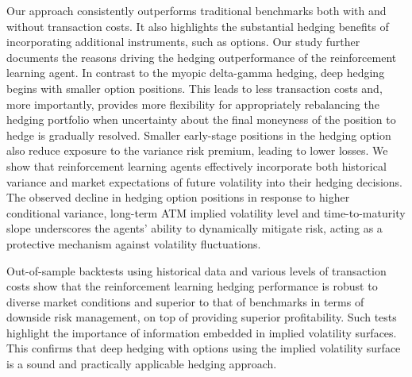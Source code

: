 \documentclass[12pt]{article}
\begin{document}
Our approach consistently outperforms traditional benchmarks both with and without transaction costs. It also highlights the substantial hedging benefits of incorporating additional instruments, such as options. 
Our study further documents the reasons driving the hedging outperformance of the reinforcement learning agent. In contrast to the myopic delta-gamma hedging, deep hedging begins with smaller option positions. This leads to less transaction costs and, more importantly, provides more flexibility for appropriately rebalancing the hedging portfolio when uncertainty about the final moneyness of the position to hedge is gradually resolved.
Smaller early-stage positions in the hedging option also reduce exposure to the variance risk premium, leading to lower losses.
We show that reinforcement learning agents effectively incorporate both historical variance and market expectations of future volatility into their hedging decisions. The observed decline in hedging option positions in response to higher conditional variance, long-term ATM implied volatility level and time-to-maturity slope underscores the agents' ability to dynamically mitigate risk, acting as a protective mechanism against volatility fluctuations.

Out-of-sample backtests using historical data and various levels of transaction costs show that the reinforcement learning hedging performance is robust to diverse market conditions and superior to that of benchmarks in terms of downside risk management, on top of providing superior profitability. Such tests highlight the importance of information embedded in implied volatility surfaces. This confirms that deep hedging with options using the implied volatility surface is a sound and practically applicable hedging approach.





%
%
  
\end{document}
